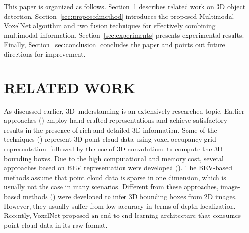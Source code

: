 \documentclass[letterpaper, 10 pt, conference]{ieeeconf}
\begin{document}
This paper is organized as follows. Section~\ref{sec:relatedwork} describes related work on 3D object detection. Section~\ref{sec:proposedmethod} introduces the proposed Multimodal VoxelNet algorithm and two fusion techniques for effectively combining multimodal information. Section~\ref{sec:experiments} presents experimental results. Finally, Section~\ref{sec:conclusion} concludes the paper and points out future directions for improvement. 




\section{RELATED WORK}
\label{sec:relatedwork}
As discussed earlier, 3D understanding is an extensively researched topic. Earlier approaches (\cite{REF:PointSignatures_Chua1997,REF:StructuralIndexing_Medioni92,REF:Nishino2010,REF:COSMOS_Jain97,REF:Tuzel2014}) employ hand-crafted representations and achieve satisfactory results in the presence of rich and detailed 3D information. Some of the 	techniques (\cite{REF:Wang-RSS-15,REF:Vote3Deep,REF:SlidingShapes_Song2014,REF:SlidingShapes_Song2014,REF:3DFCN}) represent 3D point cloud data using voxel occupancy grid representation, followed by the use of 3D convolutions to compute the 3D bounding boxes. Due to the high computational and memory cost, several approaches based on BEV representation were developed (\cite{REF:FusionDPM-IROS14,REF:MV-RGBD-RF2015,Yang2018CVPR}). The BEV-based methods assume that point cloud data is sparse in one dimension, which is usually not the case in many scenarios. Different from these approaches, image-based methods (\cite{REF:cvpr16chen,REF:nips15chen,REF:xiang_cvpr15,REF:Zia2013,REF:Zia2014,REF:SFM2015,REF:chabot2017deep}) were developed to infer 3D bounding boxes from 2D images. However, they usually suffer from low accuracy in terms of depth localization. Recently, VoxelNet \cite{REF:zhou2017voxelnet} proposed an end-to-end learning architecture that consumes point cloud data in its raw format. 
\end{document}

